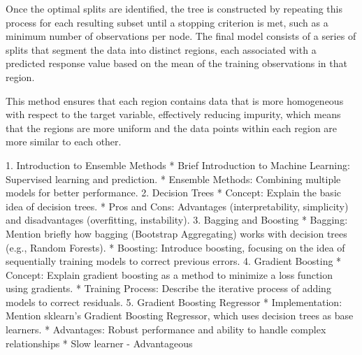 Once the optimal splits are identified, the tree is constructed by repeating this process for each resulting subset until a stopping criterion is met, such as a minimum number of observations per node. 
The final model consists of a series of splits that segment the data into distinct regions, each associated with a predicted response value based on the mean of the training observations in that region.

This method ensures that each region contains data that is more homogeneous with respect to the target variable, effectively reducing impurity, which means that the regions are more uniform and the data points within each region are more similar to each other. 











1. Introduction to Ensemble Methods
    * Brief Introduction to Machine Learning: Supervised learning and prediction.
    * Ensemble Methods: Combining multiple models for better performance.
2. Decision Trees
    * Concept: Explain the basic idea of decision trees.
    * Pros and Cons: Advantages (interpretability, simplicity) and disadvantages (overfitting, instability).
3. Bagging and Boosting
    * Bagging: Mention briefly how bagging (Bootstrap Aggregating) works with decision trees (e.g., Random Forests).
    * Boosting: Introduce boosting, focusing on the idea of sequentially training models to correct previous errors.
4. Gradient Boosting
    * Concept: Explain gradient boosting as a method to minimize a loss function using gradients.
    * Training Process: Describe the iterative process of adding models to correct residuals.
5. Gradient Boosting Regressor
    * Implementation: Mention sklearn's Gradient Boosting Regressor, which uses decision trees as base learners.
    * Advantages: Robust performance and ability to handle complex relationships
    * Slow learner - Advantageous